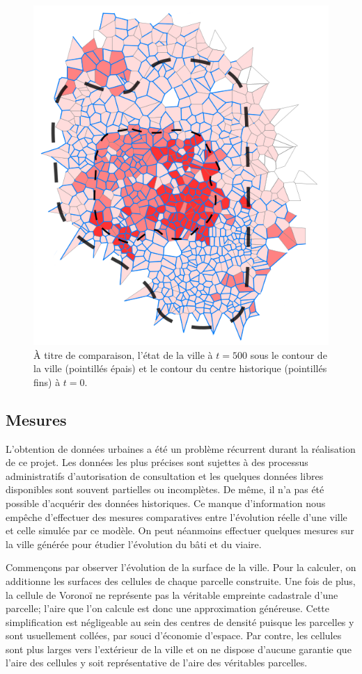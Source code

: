 \documentclass[10pt]{article}
\begin{document}
\begin{figure}[H]
  \centering
  \includegraphics[width=.8\linewidth]{images/lh_500_comparison.png}
  \caption{À titre de comparaison, l'état de la ville à $t = 500$ sous
    le contour de la ville (pointillés épais) et le contour du centre
    historique (pointillés fins) à $t = 0$.}
    \label{fig:lh_comp}
\end{figure}

\subsection{Mesures}

L'obtention de données urbaines a été un problème récurrent durant la
réalisation de ce projet. Les données les plus précises sont sujettes
à des processus administratifs d'autorisation de consultation et les
quelques données libres disponibles sont souvent partielles ou
incomplètes. De même, il n'a pas été possible d'acquérir des données
historiques. Ce manque d'information nous empêche d'effectuer des
mesures comparatives entre l'évolution réelle d'une ville et celle
simulée par ce modèle. On peut néanmoins effectuer quelques mesures
sur la ville générée pour étudier l'évolution du bâti et du viaire.

Commençons par observer l'évolution de la surface de la ville. Pour la
calculer, on additionne les surfaces des cellules de chaque parcelle
construite. Une fois de plus, la cellule de Voronoï ne représente pas
la véritable empreinte cadastrale d'une parcelle; l'aire que l'on
calcule est donc une approximation généreuse. Cette simplification est
négligeable au sein des centres de densité puisque les parcelles y
sont usuellement collées, par souci d'économie d'espace. Par contre,
les cellules sont plus larges vers l'extérieur de la ville et on ne
dispose d'aucune garantie que l'aire des cellules y soit
représentative de l'aire des véritables parcelles.
\end{document}
